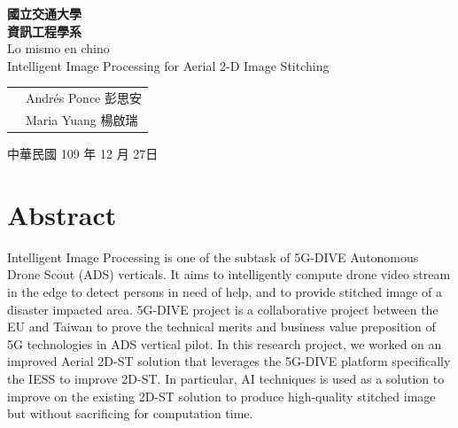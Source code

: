 \documentclass[12pt, a4paper]{article}
\begin{document}
\newcommand{\largeTitle}[1]{\fontsize{40}{50} #1}

\begin{titlepage}
		\begin{center}
			\largeTitle \textbf{國立交通大學} \\[0.25cm]
			\largeTitle \textbf{資訊工程學系} \\[0.25cm]

			\LARGE{Lo mismo en chino} \\[0.5cm]

			\LARGE{Intelligent Image Processing for Aerial 2-D Image Stitching}
		\end{center}

		\vspace{\fill}
		\begin{tabular}{c l}
			{\makebox[8em][s]{\LARGE 大學生}} & \LARGE Andr\'es Ponce 彭思安 \\[0.5cm]
			{\makebox[8em][s]{\LARGE 指導教授}} & \LARGE Maria Yuang 楊啟瑞 \\[0.5cm]
		\end{tabular}

		\vspace{3cm}
		\begin{center}
			{\LARGE 中華民國 109 年 12 月 27日}
		\end{center}
\end{titlepage}

\section{Abstract}
\label{sec:Abstract}
Intelligent Image Processing is one of the subtask of 5G-DIVE Autonomous Drone Scout (ADS) verticals. It 
aims  to  intelligently  compute  drone  video  stream  in  the  edge  to  detect  persons  in  need  of  help,  and  to 
provide stitched image of a disaster impacted area. 5G-DIVE project is a collaborative project between the 
EU  and  Taiwan  to  prove  the  technical  merits  and  business  value  preposition  of  5G  technologies  in  ADS 
vertical pilot. In this research project, we worked on an improved Aerial 2D-ST solution that leverages the 
5G-DIVE platform specifically the IESS to improve 2D-ST. In particular, AI techniques is used as a solution to 
improve on the existing 2D-ST solution to produce high-quality stitched image but without sacrificing for 
computation time.
\end{document}
